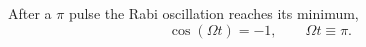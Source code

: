 \documentclass{article}
\begin{document}
After a $\pi$ pulse the Rabi oscillation reaches its minimum,
\begin{equation}
\cos(\Omega t) = -1, \qquad \Omega t \equiv \pi .
\label{eq:pi}
\end{equation}
\end{document}
